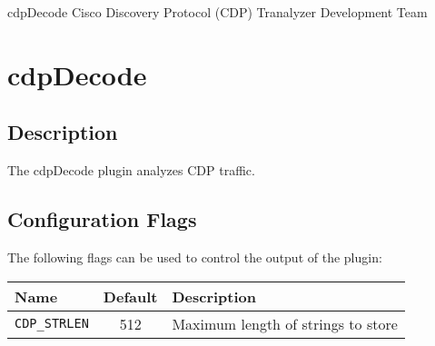 \documentclass[documentation]{subfiles}
\begin{document}
\trantitle
    {cdpDecode} %
    {Cisco Discovery Protocol (CDP)} %
    {Tranalyzer Development Team} %

\section{cdpDecode}\label{s:cdpDecode}

\subsection{Description}
The cdpDecode plugin analyzes CDP traffic.




%
%

\subsection{Configuration Flags}
The following flags can be used to control the output of the plugin:
\begin{longtable}{lcl}
    \toprule
    {\bf Name} & {\bf Default} & {\bf Description}\\
    \midrule\endhead%
    {\tt CDP\_STRLEN}    & 512 & Maximum length of strings to store\\
    \bottomrule
\end{longtable}
\end{document}

